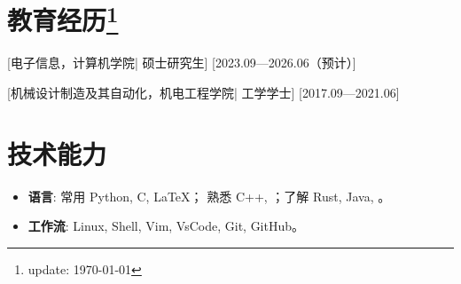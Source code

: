 \documentclass{resume}
\begin{document}


\ResumeTitle

\section[教育经历]{教育经历\protect\footnote{update: \today}}
[\textnormal{电子信息，计算机学院|}  硕士研究生]
[2023.09—2026.06（预计）]

[\textnormal{机械设计制造及其自动化，机电工程学院|} 工学学士]
[2017.09—2021.06]

\section[技术能力]{技术能力\protect}
\begin{itemize}
  \item \textbf{语言}: 常用 Python, C, \LaTeX； 熟悉 C++, ；了解 Rust, Java, 。
  \item \textbf{工作流}: Linux, Shell, Vim, VsCode, Git, GitHub。
\end{itemize}



\end{document}
